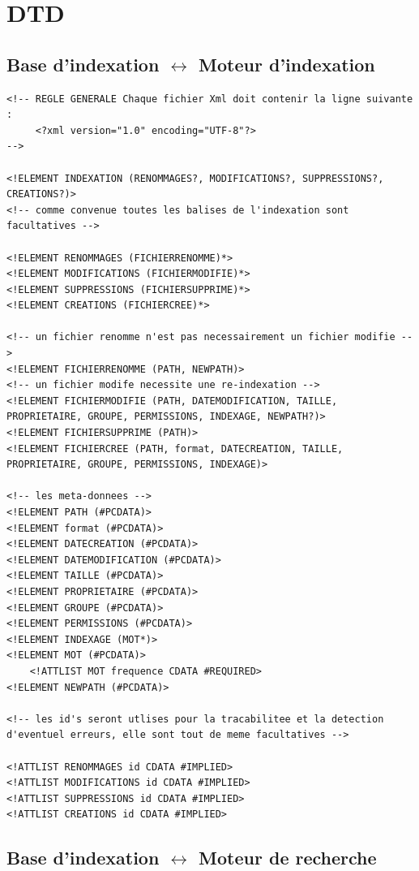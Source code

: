 \documentclass[a4paper,12pt]{report}
\begin{document}
\section{DTD}\label{dtd}

\subsection{Base d'indexation $\leftrightarrow$ Moteur d'indexation}\label{dtd_bi_mi}
\begin{lstlisting}[frame=single]
<!-- REGLE GENERALE Chaque fichier Xml doit contenir la ligne suivante :
     <?xml version="1.0" encoding="UTF-8"?>
-->

<!ELEMENT INDEXATION (RENOMMAGES?, MODIFICATIONS?, SUPPRESSIONS?, CREATIONS?)>
<!-- comme convenue toutes les balises de l'indexation sont facultatives -->

<!ELEMENT RENOMMAGES (FICHIERRENOMME)*>
<!ELEMENT MODIFICATIONS (FICHIERMODIFIE)*>
<!ELEMENT SUPPRESSIONS (FICHIERSUPPRIME)*>
<!ELEMENT CREATIONS (FICHIERCREE)*>

<!-- un fichier renomme n'est pas necessairement un fichier modifie -->
<!ELEMENT FICHIERRENOMME (PATH, NEWPATH)>
<!-- un fichier modife necessite une re-indexation -->
<!ELEMENT FICHIERMODIFIE (PATH, DATEMODIFICATION, TAILLE, PROPRIETAIRE, GROUPE, PERMISSIONS, INDEXAGE, NEWPATH?)>
<!ELEMENT FICHIERSUPPRIME (PATH)>
<!ELEMENT FICHIERCREE (PATH, format, DATECREATION, TAILLE, PROPRIETAIRE, GROUPE, PERMISSIONS, INDEXAGE)>

<!-- les meta-donnees -->
<!ELEMENT PATH (#PCDATA)>
<!ELEMENT format (#PCDATA)>
<!ELEMENT DATECREATION (#PCDATA)>
<!ELEMENT DATEMODIFICATION (#PCDATA)>
<!ELEMENT TAILLE (#PCDATA)>
<!ELEMENT PROPRIETAIRE (#PCDATA)>
<!ELEMENT GROUPE (#PCDATA)>
<!ELEMENT PERMISSIONS (#PCDATA)>
<!ELEMENT INDEXAGE (MOT*)>
<!ELEMENT MOT (#PCDATA)>
	<!ATTLIST MOT frequence CDATA #REQUIRED>
<!ELEMENT NEWPATH (#PCDATA)>

<!-- les id's seront utlises pour la tracabilitee et la detection d'eventuel erreurs, elle sont tout de meme facultatives -->

<!ATTLIST RENOMMAGES id CDATA #IMPLIED>
<!ATTLIST MODIFICATIONS id CDATA #IMPLIED>
<!ATTLIST SUPPRESSIONS id CDATA #IMPLIED>
<!ATTLIST CREATIONS id CDATA #IMPLIED>
\end{lstlisting}

\newpage
\subsection{Base d'indexation $\leftrightarrow$ Moteur de recherche}
\end{document}
